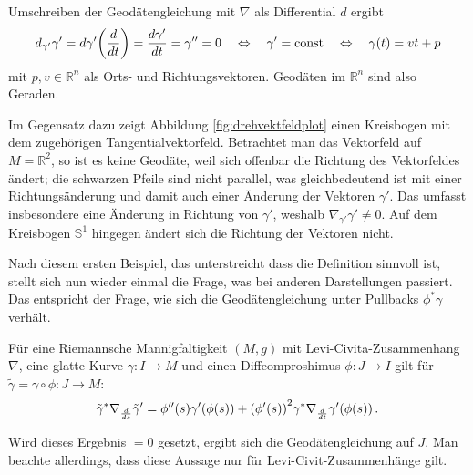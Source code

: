 \documentclass[../H_Analysis_main.tex]{subfiles}
\begin{document}
\begin{bsp}[Geraden]
Umschreiben der Geodätengleichung mit $\nabla$ als Differential $d$ ergibt
\begin{equation}
d_{\gamma'} \gamma' = d\gamma'\qty(\dv{t}) = \dv{\gamma'}{t} = \gamma'' = 0 \quad \Leftrightarrow \quad \gamma' = \text{const} \quad \Leftrightarrow \quad \gamma(t) = v t + p
\end{equation}
mit $p, v \in \mathbb{R}^n$ als Orts- und Richtungsvektoren. Geodäten im $\mathbb{R}^n$ sind also Geraden.

Im Gegensatz dazu zeigt Abbildung \ref{fig:drehvektfeldplot} einen Kreisbogen mit dem zugehörigen Tangentialvektorfeld. Betrachtet man das Vektorfeld auf $M = \mathbb{R}^2$, so ist es keine Geodäte, weil sich offenbar die Richtung des Vektorfeldes ändert; die schwarzen Pfeile sind nicht parallel, was gleichbedeutend ist mit einer Richtungsänderung und damit auch einer Änderung der Vektoren $\gamma'$. Das umfasst insbesondere eine Änderung in Richtung von $\gamma'$, weshalb $\nabla_{\gamma'} \gamma' \neq 0$. Auf dem Kreisbogen $\mathbb{S}^1$ hingegen ändert sich die Richtung der Vektoren nicht.
\end{bsp}


\iffalse
\begin{figure}
\centering

\texttt{[image: Bilder/vectorfield\_example\_circle.pdf]}

\caption{Tangentialvektorfeld am Kreisbogen}
\label{fig:keine_geodaete}
\end{figure}
\fi


Nach diesem ersten Beispiel, das unterstreicht dass die Definition sinnvoll ist, stellt sich nun wieder einmal die Frage, was bei anderen Darstellungen passiert. Das entspricht der Frage, wie sich die Geodätengleichung unter Pullbacks $\phi^* \gamma$ verhält.
\begin{lemma}
Für eine Riemannsche Mannigfaltigkeit $(M, g)$ mit Levi-Civita-Zusammenhang $\nabla$, eine glatte Kurve $\gamma: I \rightarrow M$ und einen Diffeomproshimus $\phi: J \rightarrow I$ gilt für $\tilde{\gamma} = \gamma \circ \phi: J \rightarrow M$:
\begin{equation}
\tilde{\gamma}^* \nabla_{\dv{s}} \tilde{\gamma}' = \phi''(s) \gamma'\qty(\phi(s)) + \qty(\phi'(s))^2 \gamma^* \nabla_{\dv{t}} \gamma'\qty(\phi(s)) \, .
\end{equation}
\end{lemma}
Wird dieses Ergebnis $= 0$ gesetzt, ergibt sich die Geodätengleichung auf $J$. Man beachte allerdings, dass diese Aussage nur für Levi-Civit-Zusammenhänge gilt.\\
\end{document}
